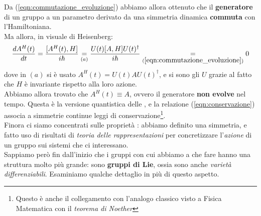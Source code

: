 \documentclass[../../FisicaTeorica.tex]{subfiles}
\begin{document}
Da (\ref{eqn:commutazione_evoluzione}) abbiamo allora ottenuto che il \textbf{generatore} di un gruppo a un parametro  derivato da una simmetria dinamica \textbf{commuta} con l'Hamiltoniana.\\
Ma allora, in visuale di Heisenberg:
\begin{equation}
\frac{dA^H(t)}{dt}=\frac{[A^H(t),H]}{i\hbar}\underset{(a)}{=}\frac{U(t)[A,H]U(t)^\dag}{i\hbar} \underset{(\ref{eqn:commutazione_evoluzione})}{=} 0
\label{eqn:conservazione}
\end{equation}
dove in $(a)$ si è usato $A^H(t)=U(t)AU(t)^\dag$, e si sono  gli $U$ grazie al fatto che $H$ è invariante rispetto alla loro azione.\\
Abbiamo allora trovato che $A^H(t) \equiv A$, ovvero il generatore \textbf{non evolve} nel tempo. Questa è la versione quantistica delle , e la relazione (\ref{eqn:conservazione}) associa a simmetrie continue leggi di conservazione\footnote{Questo è anche il collegamento con l'analogo classico visto a Fisica Matematica con il \textit{teorema di Noether}}.\\

Finora ci siamo concentrati sulle proprietà : abbiamo definito una simmetria, e fatto uso di risultati di \textit{teoria delle rappresentazioni} per concretizzare l'\textit{azione} di un gruppo sui sistemi che ci interessano.\\
Sappiamo però fin dall'inizio che i gruppi  con cui abbiamo a che fare hanno una struttura molto più grande: sono \textbf{gruppi di Lie}, ossia sono anche \textit{varietà differenziabili}. Esaminiamo qualche dettaglio in più di questo aspetto.\\
\end{document}
